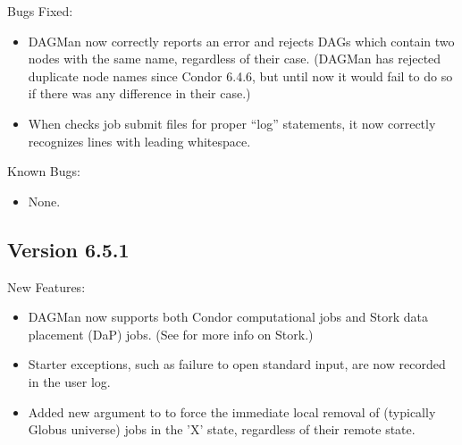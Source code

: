 \noindent Bugs Fixed:
\begin{itemize}

\item DAGMan now correctly reports an error and rejects DAGs which
      contain two nodes with the same name, regardless of their case.
      (DAGMan has rejected duplicate node names since Condor 6.4.6,
      but until now it would fail to do so if there was any difference
      in their case.)

\item When  checks job submit files for proper
      ``log'' statements, it now correctly recognizes lines with
      leading whitespace.

\end{itemize}

\noindent Known Bugs:
\begin{itemize}

\item None.

\end{itemize}


\subsection{\label{sec:New-6-5-1}Version 6.5.1}

\noindent New Features:
\begin{itemize}

\item DAGMan now supports both Condor computational jobs and Stork data
placement (DaP) jobs.  (See 
for more info on Stork.)

\item Starter exceptions, such as failure to open standard input, are
now recorded in the user log.

\item Added new  argument to  to force the
immediate local removal of (typically Globus universe) jobs in the 'X'
state, regardless of their remote state.

\end{itemize}

